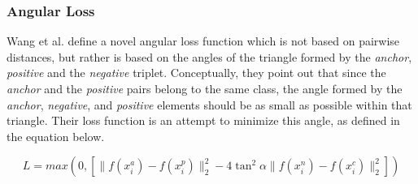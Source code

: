 \subsubsection{Angular Loss}
Wang et al. \cite{DBLP:journals/corr/abs-1708-01682} define a novel angular loss function which is not based on pairwise distances, but rather is based on the angles of the triangle formed by the \textit{anchor}, \textit{positive} and the \textit{negative} triplet.  Conceptually, they point out that since the \textit{anchor} and the \textit{positive} pairs belong to the same class, the angle formed by the \textit{anchor}, \textit{negative}, and \textit{positive} elements should be as small as possible within that triangle.  Their loss function is an attempt to minimize this angle, as defined in the equation below.

\begin{equation}
L = max(0, \left[\|f(x_i^a) - f(x_i^p)\|_{2}^2 - 4 \tan^2 \alpha \|f(x_i^n) - f(x_i^c)\|_{2}^2 \right])
\end{equation}
